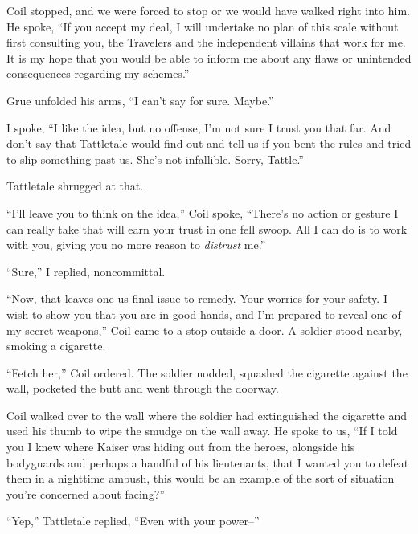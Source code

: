 Coil stopped, and we were forced to stop or we would have walked right into him.  He spoke, ``If you accept my deal, I will undertake no plan of this scale without first consulting you, the Travelers and the independent villains that work for me.  It is my hope that you would be able to inform me about any flaws or unintended consequences regarding my schemes.''



Grue unfolded his arms, ``I can't say for sure.  Maybe.''



I spoke, ``I like the idea, but no offense, I'm not sure I trust you that far.  And don't say that Tattletale would find out and tell us if you bent the rules and tried to slip something past us.  She's not infallible.  Sorry, Tattle.''



Tattletale shrugged at that.



``I'll leave you to think on the idea,'' Coil spoke, ``There's no action or gesture I can really take that will earn your trust in one fell swoop.  All I can do is to work with you, giving you no more reason to \emph{distrust} me.''



``Sure,'' I replied, noncommittal.



``Now, that leaves one us final issue to remedy.  Your worries for your safety.  I wish to show you that you are in good hands, and I'm prepared to reveal one of my secret weapons,''  Coil came to a stop outside a door.  A soldier stood nearby, smoking a cigarette.



``Fetch her,'' Coil ordered.  The soldier nodded, squashed the cigarette against the wall, pocketed the butt and went through the doorway.



Coil walked over to the wall where the soldier had extinguished the cigarette and used his thumb to wipe the smudge on the wall away.  He spoke to us, ``If I told you I knew where Kaiser was hiding out from the heroes, alongside his bodyguards and perhaps a handful of his lieutenants, that I wanted you to defeat them in a nighttime ambush, this would be an example of the sort of situation you're concerned about facing?''



``Yep,'' Tattletale replied, ``Even with your power--''



